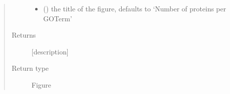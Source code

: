 \documentclass[letterpaper,10pt,english]{sphinxmanual}
\begin{document}
\begin{fulllineitems}
\begin{quote}
\begin{description}
\begin{itemize}
\item {} 
 (\sphinxstyleliteralemphasis{\sphinxupquote{, }}) \textendash{} the title of the figure, defaults to ‘Number of proteins per GO\sphinxhyphen{}Term’

\end{itemize}

\item[{Returns}] \leavevmode
{[}description{]}

\item[{Return type}] \leavevmode
Figure

\end{description}\end{quote}

\end{fulllineitems}

\end{document}
